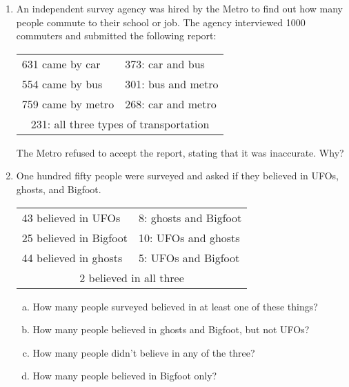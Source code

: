 \begin{enumerate}
\item An independent survey agency was hired by the Metro to find out how many people commute to their school or job.  The agency interviewed 1000 commuters and submitted the following report:
\begin{center}
\begin{tabular}{l l}
631 came by car & 373: car and bus\\
554 came by bus & 301: bus and metro\\
759 came by metro & 268: car and metro\\
\multicolumn{2}{c}{231: all three types of transportation}
\end{tabular}
\end{center}
The Metro refused to accept the report, stating that it was inaccurate.  Why? 

\item One hundred fifty people were surveyed and asked if they believed in UFOs, ghosts, and Bigfoot.
\begin{center}
\begin{tabular}{l l}
43 believed in UFOs & 8: ghosts and Bigfoot\\
25 believed in Bigfoot & 10: UFOs and ghosts\\
44 believed in ghosts & 5: UFOs and Bigfoot\\
\multicolumn{2}{c}{2 believed in all three}
\end{tabular}
\end{center}
\begin{enumerate}[(a)]
\item How many people surveyed believed in at least one of these things? 
\item How many people believed in ghosts and Bigfoot, but not UFOs? 
\item How many people didn't believe in any of the three? 
\item How many people believed in Bigfoot only? 
\end{enumerate}


\end{enumerate}
